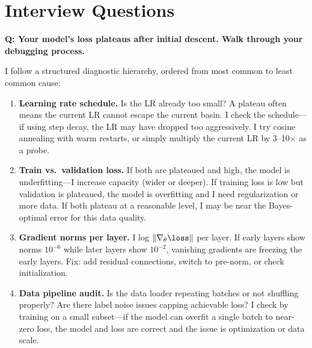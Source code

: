 \section{Interview Questions}
\label{sec:training_interview}

\begin{interviewq}
\textbf{Q: Your model's loss plateaus after initial descent. Walk through your debugging process.}

 \quad {} \quad \badgefreq{\freqhigh}

\stronganswer

I follow a structured diagnostic hierarchy, ordered from most common to least common cause:

\begin{enumerate}
    \item \textbf{Learning rate schedule.} Is the LR already too small? A plateau often means the current LR cannot escape the current basin. I check the schedule---if using step decay, the LR may have dropped too aggressively. I try cosine annealing with warm restarts, or simply multiply the current LR by 3--10$\times$ as a probe.

    \item \textbf{Train vs.\ validation loss.} If both are plateaued and high, the model is underfitting---I increase capacity (wider or deeper). If training loss is low but validation is plateaued, the model is overfitting and I need regularization or more data. If both plateau at a reasonable level, I may be near the Bayes-optimal error for this data quality.

    \item \textbf{Gradient norms per layer.} I log $\|\nabla_\theta \loss\|$ per layer. If early layers show norms $10^{-6}$ while later layers show $10^{-2}$, vanishing gradients are freezing the early layers. Fix: add residual connections, switch to pre-norm, or check initialization.

    \item \textbf{Data pipeline audit.} Is the data loader repeating batches or not shuffling properly? Are there label noise issues capping achievable loss? I check by training on a small subset---if the model can overfit a single batch to near-zero loss, the model and loss are correct and the issue is optimization or data scale.


\end{enumerate}
\end{interviewq}
